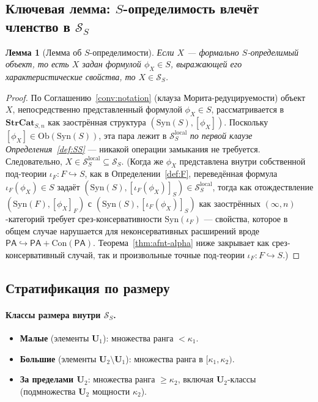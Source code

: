 \documentclass[11pt]{article}
\theoremstyle{plain}
\newtheorem{lemma}[theorem]{Лемма}
\theoremstyle{definition}
\newcommand{\cS}{\mathcal{S}}
\newcommand{\Ob}{\mathrm{Ob}}
\newcommand{\Syn}{\mathrm{Syn}}
\newcommand{\Con}{\mathrm{Con}}
\newcommand{\PA}{\mathsf{PA}}
\begin{document}
\subsection{\texorpdfstring{Ключевая лемма: $S$-определимость влечёт членство в $\cS_S$}{Ключевая лемма: S-определимость влечёт членство в S\_S}}

\begin{lemma}[Лемма об $S$-определимости]\label{lem:SS-membership}
Если $X$ — формально $S$-определимый объект, то есть $X$ задан формулой $\phi_X \in S$, выражающей его характеристические свойства, то $X \in \cS_S$.
\end{lemma}

\begin{proof}
По Соглашению~\ref{conv:notation} (клауза Морита-редуцируемости) объект $X$, непосредственно представленный формулой $\phi_X \in S$, рассматривается в $\mathbf{StrCat}_{S, n}$ как заострённая структура $(\Syn(S), [\phi_X])$. Поскольку $[\phi_X] \in \Ob(\Syn(S))$, эта пара лежит в $\cS_S^{\mathrm{local}}$ \emph{по первой клаузе Определения~\ref{def:SS}} --- никакой операции замыкания не требуется. Следовательно, $X \in \cS_S^{\mathrm{local}} \subseteq \cS_S$. (Когда же $\phi_X$ представлена внутри собственной под-теории $\iota_F : F \hookrightarrow S$, как в Определении~\ref{def:F}, переведённая формула $\iota_F(\phi_X) \in S$ задаёт $(\Syn(S), [\iota_F(\phi_X)]_S) \in \cS_S^{\mathrm{local}}$, тогда как отождествление $(\Syn(F), [\phi_X]_F)$ с $(\Syn(S), [\iota_F(\phi_X)]_S)$ как заострённых $(\infty, n)$-категорий требует срез-консервативности $\Syn(\iota_F)$ --- свойства, которое в общем случае нарушается для неконсервативных расширений вроде $\PA \hookrightarrow \PA + \Con(\PA)$. Теорема~\ref{thm:afnt-alpha} ниже закрывает как срез-консервативный случай, так и произвольные точные под-теории $\iota_F : F \hookrightarrow S$.)
\end{proof}

\subsection{Стратификация по размеру}\label{sec:size-stratification}

\paragraph{Классы размера внутри $\cS_S$.}
\begin{itemize}
\item \textbf{Малые} (элементы $\mathbf{U}_1$): множества ранга $< \kappa_1$.
\item \textbf{Большие} (элементы $\mathbf{U}_2 \setminus \mathbf{U}_1$): множества ранга в $[\kappa_1, \kappa_2)$.
\item \textbf{За пределами $\mathbf{U}_2$}: множества ранга $\geq \kappa_2$, включая $\mathbf{U}_2$-классы (подмножества $\mathbf{U}_2$ мощности $\kappa_2$).
\end{itemize}
\end{document}

